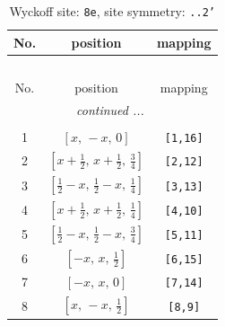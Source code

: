 \documentclass[fleqn,8pt]{jsarticle}
\begin{document}
\begin{longtable}{ccc}
\caption{Wyckoff site: {\tt 8e}, site symmetry: {\tt ..2'}}
 \\
 \hline \hline
No. & position & mapping \\ \hline \endfirsthead

\multicolumn{2}{l}{\tablename\ \thetable{}} \\
 \hline \hline
No. & position & mapping \\ \hline \endhead

 \hline \hline
\multicolumn{2}{r}{\footnotesize\it continued ...} \\ \endfoot

 \hline \hline
\multicolumn{2}{r}{} \\ \endlastfoot

1 & $\left[ x,\, - x,\, 0 \right]$ & {\tt [1,16]} \\ \hline
2 & $\left[ x + \frac{1}{2},\, x + \frac{1}{2},\, \frac{3}{4} \right]$ & {\tt [2,12]} \\ \hline
3 & $\left[ \frac{1}{2} - x,\, \frac{1}{2} - x,\, \frac{1}{4} \right]$ & {\tt [3,13]} \\ \hline
4 & $\left[ x + \frac{1}{2},\, x + \frac{1}{2},\, \frac{1}{4} \right]$ & {\tt [4,10]} \\ \hline
5 & $\left[ \frac{1}{2} - x,\, \frac{1}{2} - x,\, \frac{3}{4} \right]$ & {\tt [5,11]} \\ \hline
6 & $\left[ - x,\, x,\, \frac{1}{2} \right]$ & {\tt [6,15]} \\ \hline
7 & $\left[ - x,\, x,\, 0 \right]$ & {\tt [7,14]} \\ \hline
8 & $\left[ x,\, - x,\, \frac{1}{2} \right]$ & {\tt [8,9]} \\
\end{longtable}
\renewcommand{\arraystretch}{1.2}
\end{document}
